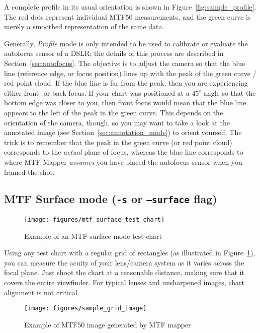 \documentclass[a4paper]{article}
\begin{document}
A complete profile in its usual orientation is shown in 
Figure~\ref{fig:sample_profile}. The red dots represent individual MTF50
measurements, and the green curve is merely a smoothed representation of the
same data.

Generally, \emph{Profile} mode is only intended to be used to calibrate or
evaluate the autofocus sensor of a DSLR; the details of this process are
described in Section~\ref{sec:autofocus}. The objective is to adjust the
camera so that the blue line (reference edge, or focus position) lines up
with the peak of the green curve / red point cloud. If the blue line is far
from the peak, then you are experiencing either front- or back-focus. If
your chart was positioned at a $45^\circ$ angle so that the bottom edge 
was closer to you, then front focus would mean that the blue line appears to
the left of the peak in the green curve. This depends on the orientation of
the camera, though, so you may want to take a look at the annotated image
(see Section~\ref{sec:annotation_mode}) to orient yourself. The trick is to
remember that the peak in the green curve (or red point cloud) corresponds
to the \emph{actual} plane of focus, whereas the blue line corresponds to
where MTF Mapper \emph{assumes} you have placed the autofocus sensor when you
framed the shot.

\subsection{MTF Surface mode (\texttt{-s} or \texttt{--surface} flag)}
\label{sec:surface_mode}
%
\begin{figure}
\centering
\texttt{[image: figures/mtf\_surface\_test\_chart]}
\caption{Example of an MTF surface mode test chart}
\label{fig:surface_test_chart}
\end{figure}
%
Using any test chart with a regular grid of rectangles (as illustrated in
Figure~\ref{fig:surface_test_chart}), you can measure the acuity of your
lens/camera system as it varies across the focal plane. Just shoot the chart
at a reasonable distance, making sure that it covers the entire viewfinder.
For typical lenses and unsharpened images, chart alignment is not critical.

\begin{figure}[hp!]
\centering
\texttt{[image: figures/sample\_grid\_image]}
\caption{Example of MTF50 image generated by MTF mapper}
\label{fig:sample_grid_image}
\end{figure}
\end{document}
